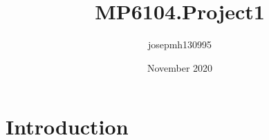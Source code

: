 \documentclass{article}
\title{MP6104.Project1}
\author{josepmh130995 }
\date{November 2020}
\begin{document}
\maketitle

\section{Introduction}
\end{document}
